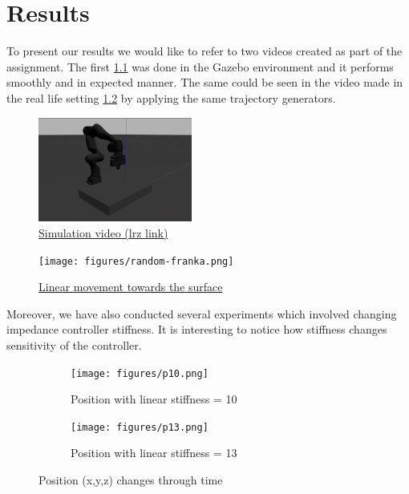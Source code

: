 \chapter{Results}\label{results}

To present our results we would like to refer to two videos created as part of the assignment. The first \ref{fig:franka-sim} was done in the Gazebo environment and it performs smoothly and in expected manner. The same could be seen in the video made in the real life setting \ref{fig:franka-real} by applying the same trajectory generators. 


\begin{figure}[htpb]
    \centering
    \includegraphics[width=0.45\textwidth]{figures/franka-sim.png}
    \caption{\href{https://gitlab.lrz.de/tum-impl-ss24/assignment2-group1/-/blob/main/media/content/gazebo-whiteboard-task-simulation.mov}{Simulation video (lrz link)}}
    \label{fig:franka-sim}
\end{figure}
\begin{figure}[htpb]
    \centering
    \texttt{[image: figures/random-franka.png]}
    \caption{\href{https://gitlab.lrz.de/tum-impl-ss24/assignment2-group1/-/raw/main/media/content/cleaning-whiteboard-task.mp4}{Linear movement towards the surface}}
    \label{fig:franka-real}
\end{figure}


Moreover, we have also conducted several experiments which involved changing impedance controller stiffness. It is interesting to notice how stiffness changes sensitivity of the controller.

\clearpage
\begin{figure}[htb]
    \centering
    \begin{subfigure}{0.46\textwidth}
        \centering
        \texttt{[image: figures/p10.png]}
        \caption{Position with linear stiffness = 10 }
        \label{fig:franka-pos-10-bag}
    \end{subfigure}
    \hfill
    \begin{subfigure}{0.46\textwidth}
        \centering
        \texttt{[image: figures/p13.png]}
        \caption{Position with linear stiffness = 13}
        \label{fig:franka-pos-13-bag}
    \end{subfigure}

    \caption{Position (x,y,z) changes through time}
    \label{fig:franka-pos-bag}
\end{figure}


